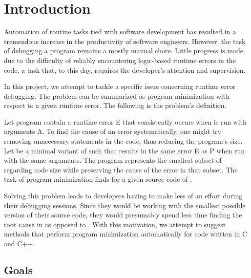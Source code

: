 \chapter{Introduction}


Automation of routine tasks tied with software development has resulted in 
a tremendous increase in the productivity of software engineers. 
However, the task of debugging a program remains a mostly manual chore. 
Little progress is made due to the difficulty of reliably encountering 
logic-based runtime errors in the code, a task that, to this day, requires 
the developer's attention and supervision. 

In this project, we attempt to tackle a specific issue concerning runtime 
error debugging. 
The problem can be summarized as program minimization with respect to a given 
runtime error. 
The following is the problem's definition.

Let program  contain a runtime error E that consistently occurs 
when  is run with arguments A. 
To find the cause of an error systematically, one might try removing 
unnecessary statements in the code, thus reducing the program's size. 
Let  be a minimal variant of  such that  
results in the same error E as P when run with the same arguments. 
The program  represents the smallest subset of  
regarding code size while preserving the cause of the error in that subset. 
The task of program minimization finds  for a given source code 
of .

Solving this problem leads to developers having to make less of an effort 
during their debugging sessions. 
Since they would be working with the smallest possible version of their 
source code, they would presumably spend less time finding the root cause 
in  as opposed to .  
With this motivation, we attempt to suggest methods that perform program 
minimization automatically for code written in C and C++.

\section{Goals}

